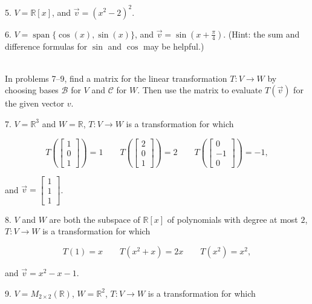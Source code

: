 \documentclass{article}
\begin{document}
5. $V = \mathbb{R}[x]$, and $\vec{v} = (x^2 - 2)^2$.

6. $V = \operatorname{span}\{\cos(x), \sin(x)\}$, and $\vec{v} = \sin\left(x + \frac{\pi}{4} \right)$. (Hint: the sum and difference formulas for $\sin$ and $\cos$ may be helpful.)

~\\

In problems 7--9, find a matrix for the linear transformation $T : V \to W$ by choosing bases $\mathcal{B}$ for $V$ and $\mathcal{C}$ for $W$. Then use the matrix to evaluate $T(\vec{v})$ for the given vector $v$.

7. $V = \mathbb{R}^3$ and $W = \mathbb{R}$, $T: V \to W$ is a transformation for which

$$
	T\left( \left[\begin{array}{c} 1 \\ 0 \\ 1 \end{array}\right] \right) = 1 \qquad T\left( \left[\begin{array}{c} 2 \\ 0 \\ 1 \end{array}\right] \right) = 2 \qquad T\left( \left[\begin{array}{c} 0 \\ -1 \\ 0 \end{array}\right] \right) = -1,
$$

and $\vec{v} = \left[\begin{array}{c} 1 \\ 1 \\ 1 \end{array}\right]$.

8. $V$ and $W$ are both the subspace of $\mathbb{R}[x]$ of polynomials with degree at most $2$, $T: V \to W$ is a transformation for which

$$
	T(1) = x \qquad T(x^2 + x) = 2x \qquad T(x^2) = x^2,
$$

and $\vec{v} = x^2 - x - 1$.

9. $V = M_{2 \times 2}(\mathbb{R})$, $W = \mathbb{R}^2$, $T: V \to W$ is a transformation for which
\end{document}
